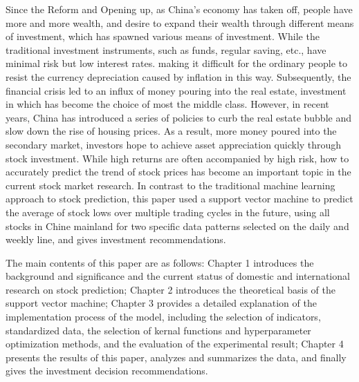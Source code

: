\begin{enabstract}
    Since the Reform and Opening up, as China's economy has taken off,
    people have more and more wealth, and desire to expand their wealth
    through different means of investment, which has spawned various means
    of investment. While the traditional investment instruments, such as
    funds, regular saving, etc., have minimal risk but low interest rates.
    making it difficult for the ordinary people to resist the currency
    depreciation caused by inflation in this way. Subsequently, the financial
    crisis led to an influx of money pouring into the real estate, investment
    in which has become the choice of most the middle class. However, in
    recent years, China has introduced a series of policies to curb the real
    estate bubble and slow down the rise of housing prices. As a result,
    more money poured into the secondary market, investors hope to achieve
    asset appreciation quickly through stock investment. While high returns are
    often accompanied by high risk, how to accurately predict the trend of
    stock prices has become an important topic in the current stock market
    research. In contrast to the traditional machine learning approach to 
    stock prediction, this paper used a support vector machine to predict 
    the average of stock lows over multiple trading cycles in the future, 
    using all stocks in Chine mainland for two specific data patterns selected 
    on the daily and weekly line, and gives investment recommendations.

    The main contents of this paper are as follows: Chapter 1 introduces 
    the background and significance and the current status of domestic and 
    international research on stock prediction; Chapter 2 introduces the 
    theoretical basis of the support vector machine; Chapter 3 provides a 
    detailed explanation of the implementation process of the model, including 
    the selection of indicators, standardized data, the selection of kernal 
    functions and hyperparameter optimization methods, and the evaluation of 
    the experimental result; Chapter 4 presents the results of this paper, 
    analyzes and summarizes the data, and finally gives the investment decision 
    recommendations.

\end{enabstract}
